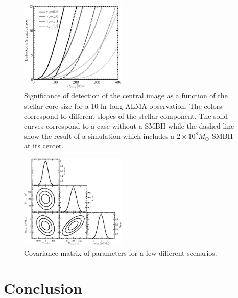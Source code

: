 \documentclass[chicago]{emulateapj}
\begin{document}
\begin{figure}
\begin{center}
\centering
\includegraphics[trim= 0 0 0 0, width=0.45\textwidth]{figures/f_03.eps}
\centering
\end{center}
\caption{ Significance of detection of the central image as a function of the stellar core size for a 10-hr long ALMA observation. The colors correspond to different slopes of the stellar component. The solid curves correspond to a case without a SMBH while the dashed line show the result of a simulation which includes a $2\times10^8M_{\odot}$ SMBH at its center.
\label{f:f2}}
\end{figure}


\begin{figure}
\begin{center}
\centering
\includegraphics[trim= 0 0 0 0, width=0.45\textwidth]{figures/f_04.eps}
\centering
\end{center}
\caption{ Covariance matrix of parameters for a few different scenarios.
\label{f:f2}}
\end{figure}



\section{Conclusion}

\acknowledgements{
}
\end{document}
